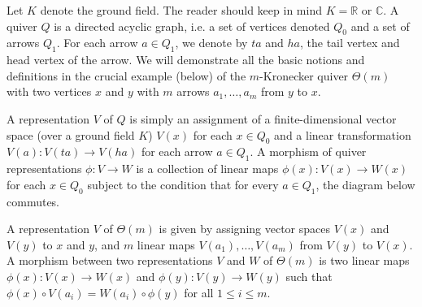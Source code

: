 \documentclass[11pt]{amsart}
\theoremstyle{definition}
\newcommand{\R}{{\mathbb R}}
\newcommand{\C}{{\mathbb C}}
\begin{document}
Let $K$ denote the ground field. The reader should keep in mind $K = \R$ or $\C$. A quiver $Q$ is a directed acyclic graph, i.e. a set of vertices denoted $Q_0$ and a set of arrows $Q_1$. For each arrow $a \in Q_1$, we denote by $ta$ and $ha$, the tail vertex and head vertex of the arrow. We will demonstrate all the basic notions and definitions in the crucial example (below) of the $m$-Kronecker quiver $\Theta(m)$ with two vertices $x$ and $y$ with $m$ arrows $a_1,\dots,a_m$ from $y$ to $x$. 

\begin{center}
\end{center}

A representation $V$ of $Q$ is simply an assignment of a finite-dimensional vector space (over a ground field $K$) $V(x)$ for each $x \in Q_0$ and a linear transformation $V(a): V(ta) \rightarrow V(ha)$ for each arrow $a \in Q_1$.  A morphism of quiver representations $\phi: V \rightarrow W$ is a collection of linear maps $\phi(x): V(x) \rightarrow W(x)$ for each $x \in Q_0$ subject to the condition that for every $a \in Q_1$, the diagram below commutes.


\begin{center}
\end{center}



A representation $V$ of $\Theta(m)$ is given by assigning vector spaces $V(x)$ and $V(y)$ to $x$ and $y$, and $m$ linear maps $V(a_1),\dots,V(a_m)$ from $V(y)$ to $V(x)$. A morphism between two representations $V$ and $W$ of $\Theta(m)$ is two linear maps $\phi(x): V(x) \rightarrow W(x)$ and $\phi(y): V(y) \rightarrow W(y)$ such that $\phi(x) \circ V(a_i) = W(a_i) \circ \phi(y)$ for all $1 \leq i \leq m$.
\end{document}

